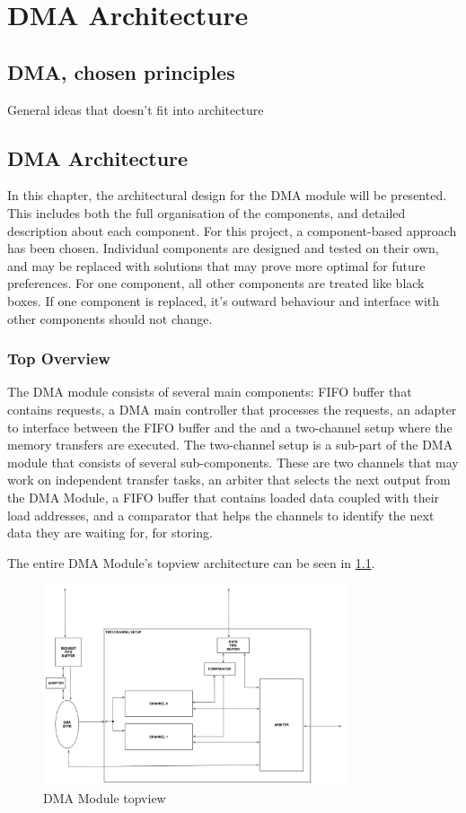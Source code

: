 \chapter{DMA Architecture}

\section{DMA, chosen principles}
General ideas that doesn't fit into architecture


\section{DMA Architecture}
In this chapter, the architectural design for the DMA module will be presented.
This includes both the full organisation of the components, and detailed description about each component. 
For this project, a component-based approach has been chosen.
Individual components are designed and tested on their own, and may be replaced with solutions that may prove more optimal for future preferences.
For one component, all other components are treated like black boxes.
If one component is replaced, it's outward behaviour and interface with other components should not change.

\subsection{Top Overview}
The DMA module consists of several main components: FIFO buffer that contains requests, a DMA main controller that processes the requests, an adapter to interface between the FIFO buffer and the and a two-channel setup where the memory transfers are executed. 
The two-channel setup is a sub-part of the DMA module that consists of several sub-components.
These are two channels that may work on independent transfer tasks, an arbiter that selects the next output from the DMA Module, a FIFO buffer that contains loaded data coupled with their load addresses, and a comparator that helps the channels to identify the next data they are waiting for, for storing.

The entire DMA Module's topview architecture can be seen in 
\ref{fig:DMATopView}.

\begin{figure}[h!]
    \centering
    \includegraphics[width=0.8\textwidth]{Figures/DMA/TopViewFinalSimple}
    \caption{DMA Module topview}
    \label{fig:DMATopView}
\end{figure}

